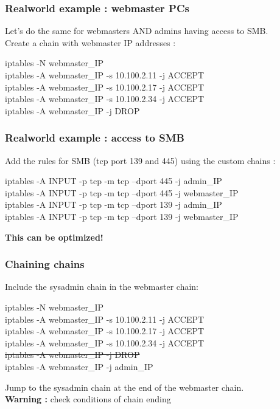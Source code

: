 \documentclass[14pt]{beamer}
\begin{document}
  \begin{frame}
    \frametitle{Realworld example : webmaster PCs}
    Let's do the same for webmasters AND admins having access to SMB.\\
    Create a chain with webmaster IP addresses :
    \begin{example}
      \small{iptables -N webmaster\_IP\\
      iptables -A webmaster\_IP -s 10.100.2.11 -j ACCEPT\\
      iptables -A webmaster\_IP -s 10.100.2.17 -j ACCEPT\\
      iptables -A webmaster\_IP -s 10.100.2.34 -j ACCEPT\\
      iptables -A webmaster\_IP -j DROP}
    \end{example}
  \end{frame}
  \begin{frame}
    \frametitle{Realworld example : access to SMB}
    Add the rules for SMB (tcp port 139 and 445) using the custom chains :
    \begin{example}
      \small{iptables -A INPUT -p tcp -m tcp --dport 445 -j admin\_IP\\
      iptables -A INPUT -p tcp -m tcp --dport 445 -j webmaster\_IP\\
      iptables -A INPUT -p tcp -m tcp --dport 139 -j admin\_IP\\
      iptables -A INPUT -p tcp -m tcp --dport 139 -j webmaster\_IP}
    \end{example}
  \pause
  \textbf{This can be optimized!}
  \end{frame}
  \begin{frame}
    \frametitle{Chaining chains}
    Include the sysadmin chain in the webmaster chain:
    \begin{example}
      \small{iptables -N webmaster\_IP\\
      iptables -A webmaster\_IP -s 10.100.2.11 -j ACCEPT\\
      iptables -A webmaster\_IP -s 10.100.2.17 -j ACCEPT\\
      iptables -A webmaster\_IP -s 10.100.2.34 -j ACCEPT\\
      \sout{iptables -A webmaster\_IP -j DROP}\\
      iptables -A webmaster\_IP -j admin\_IP}
    \end{example}
    Jump to the sysadmin chain at the end of the webmaster chain.\\
    \textbf{Warning :} check conditions of chain ending
  \end{frame}
\end{document}
